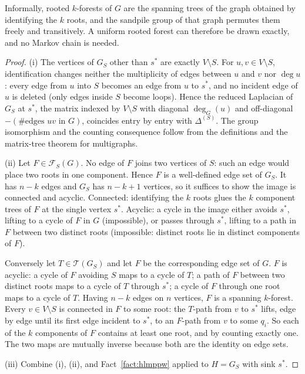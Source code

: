 \documentclass[11pt]{article}
\newcommand{\Tcal}{\mathcal{T}}
\newcommand{\Fcal}{\mathcal{F}}
\begin{document}
Informally, rooted $k$-forests of $G$ are the spanning trees of the
graph obtained by identifying the $k$ roots, and the sandpile group of
that graph permutes them freely and transitively. A uniform rooted
forest can therefore be drawn exactly, and no Markov chain is needed.

\begin{proof}
(i) The vertices of $G_S$ other than $s^*$ are exactly $V \setminus S$. For
$u, v \in V \setminus S$, identification changes neither the multiplicity of
edges between $u$ and $v$ nor $\deg u$: every edge from $u$ into $S$ becomes
an edge from $u$ to $s^*$, and no incident edge of $u$ is deleted (only
edges inside $S$ become loops). Hence the reduced Laplacian of $G_S$ at
$s^*$, the matrix indexed by $V \setminus S$ with diagonal $\deg_{G}(u)$
and off-diagonal $-(\text{\# edges } uv \text{ in } G)$, coincides entry
by entry with $\Delta^{(S)}$. The group isomorphism and the counting
consequence follow from the definitions and the matrix-tree theorem for
multigraphs.

(ii) Let $F \in \Fcal_S(G)$. No edge of $F$ joins two vertices of $S$: such
an edge would place two roots in one component. Hence $F$ is a well-defined
edge set of $G_S$. It has $n - k$ edges and $G_S$ has $n - k + 1$ vertices,
so it suffices to show the image is connected and acyclic. Connected:
identifying the $k$ roots glues the $k$ component trees of $F$ at the single
vertex $s^*$. Acyclic: a cycle in the image either avoids $s^*$, lifting to
a cycle of $F$ in $G$ (impossible), or passes through $s^*$, lifting to a
path in $F$ between two distinct roots (impossible: distinct roots lie in
distinct components of $F$).

Conversely let $T \in \Tcal(G_S)$ and let $F$ be the corresponding edge set
of $G$. $F$ is acyclic: a cycle of $F$ avoiding $S$ maps to a cycle of $T$;
a path of $F$ between two distinct roots maps to a cycle of $T$ through
$s^*$; a cycle of $F$ through one root maps to a cycle of $T$. Having
$n - k$ edges on $n$ vertices, $F$ is a spanning $k$-forest. Every
$v \in V \setminus S$ is connected in $F$ to some root: the $T$-path from
$v$ to $s^*$ lifts, edge by edge until its first edge incident to $s^*$, to
an $F$-path from $v$ to some $q_i$. So each of the $k$ components of $F$
contains at least one root, and by counting exactly one. The two maps are
mutually inverse because both are the identity on edge sets.

(iii) Combine (i), (ii), and Fact~\ref{fact:hlmppw} applied to $H = G_S$
with sink $s^*$.
\end{proof}
\end{document}
